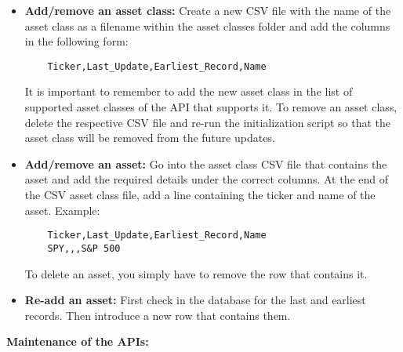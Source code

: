 \documentclass[main.tex]{subfiles}
\begin{document}
\begin{itemize}
    \item \textbf{Add/remove an asset class: }Create a new CSV file with the name of the asset class as a filename within the asset classes folder and add the columns in the following form:\newline
    \begin{lstlisting}
    Ticker,Last_Update,Earliest_Record,Name
    \end{lstlisting}
    It is important to remember to add the new asset class in the list of supported asset classes of the API that supports it.\newline
    To remove an asset class, delete the respective CSV file and re-run the initialization script so that the asset class will be removed from the future updates. 
    \item \textbf{Add/remove an asset: }Go into the asset class CSV file that contains the asset and add the required details under the correct columns.
    At the end of the CSV asset class file, add a line containing the ticker and name of the asset.\newline
    Example:
    \begin{lstlisting}
    Ticker,Last_Update,Earliest_Record,Name
    SPY,,,S&P 500
    \end{lstlisting}
    To delete an asset, you simply have to remove the row that contains it.
    
    \item \textbf{Re-add an asset: } First check in the database for the last and earliest records. Then introduce a new row that contains them.
\end{itemize}
\textbf{Maintenance of the APIs:}
\end{document}
